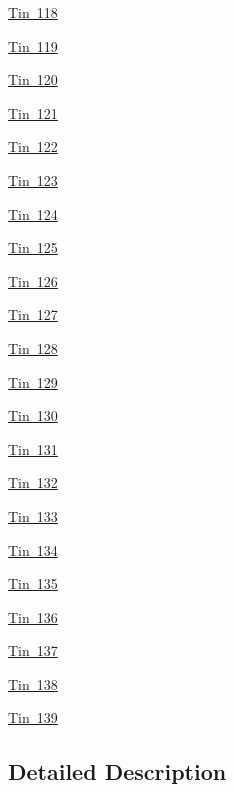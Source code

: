 \begin{DoxyCompactItemize}
\mbox{\hyperlink{group___isotope_const-_tin-_sn118}{Tin 118}}
\item 
\mbox{\hyperlink{group___isotope_const-_tin-_sn119}{Tin 119}}
\item 
\mbox{\hyperlink{group___isotope_const-_tin-_sn120}{Tin 120}}
\item 
\mbox{\hyperlink{group___isotope_const-_tin-_sn121}{Tin 121}}
\item 
\mbox{\hyperlink{group___isotope_const-_tin-_sn122}{Tin 122}}
\item 
\mbox{\hyperlink{group___isotope_const-_tin-_sn123}{Tin 123}}
\item 
\mbox{\hyperlink{group___isotope_const-_tin-_sn124}{Tin 124}}
\item 
\mbox{\hyperlink{group___isotope_const-_tin-_sn125}{Tin 125}}
\item 
\mbox{\hyperlink{group___isotope_const-_tin-_sn126}{Tin 126}}
\item 
\mbox{\hyperlink{group___isotope_const-_tin-_sn127}{Tin 127}}
\item 
\mbox{\hyperlink{group___isotope_const-_tin-_sn128}{Tin 128}}
\item 
\mbox{\hyperlink{group___isotope_const-_tin-_sn129}{Tin 129}}
\item 
\mbox{\hyperlink{group___isotope_const-_tin-_sn130}{Tin 130}}
\item 
\mbox{\hyperlink{group___isotope_const-_tin-_sn131}{Tin 131}}
\item 
\mbox{\hyperlink{group___isotope_const-_tin-_sn132}{Tin 132}}
\item 
\mbox{\hyperlink{group___isotope_const-_tin-_sn133}{Tin 133}}
\item 
\mbox{\hyperlink{group___isotope_const-_tin-_sn134}{Tin 134}}
\item 
\mbox{\hyperlink{group___isotope_const-_tin-_sn135}{Tin 135}}
\item 
\mbox{\hyperlink{group___isotope_const-_tin-_sn136}{Tin 136}}
\item 
\mbox{\hyperlink{group___isotope_const-_tin-_sn137}{Tin 137}}
\item 
\mbox{\hyperlink{group___isotope_const-_tin-_sn138}{Tin 138}}
\item 
\mbox{\hyperlink{group___isotope_const-_tin-_sn139}{Tin 139}}
\end{DoxyCompactItemize}


\subsection{Detailed Description}
